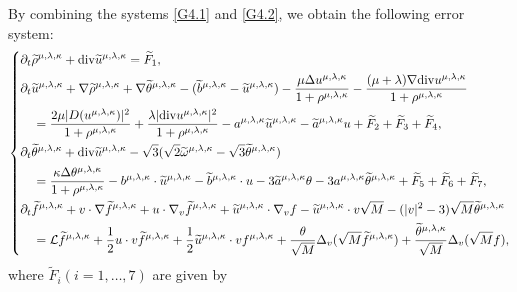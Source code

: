 \documentclass[reqno,11pt]{amsart}
\theoremstyle{plain}
\numberwithin{equation}{section}
\begin{document}
By combining the systems \eqref{G4.1} and \eqref{G4.2}, we obtain the following error system:
\begin{equation}\label{G4.3}
\left\{
\begin{aligned}
&\partial_t \widetilde{\rho}^{\mu,\lambda,\kappa}+{\rm div}\widetilde{u}^{\mu,\lambda,\kappa} =\widetilde{F}_1,\\
&\partial_{t}\widetilde{u}^{\mu,\lambda,\kappa}+\nabla \widetilde{\rho}^{\mu,\lambda,\kappa}
+\nabla\widetilde{\theta}^{\mu,\lambda,\kappa}-(\widetilde{b}^{\mu,\lambda,\kappa}-\widetilde{u}^{\mu,\lambda,\kappa})
-\frac{\mu \Delta u^{\mu,\lambda,\kappa}}{1+\rho^{\mu,\lambda,\kappa}}-\frac{(\mu+\lambda) 
\nabla {\rm div}u^{\mu,\lambda,\kappa}}{1+\rho^{\mu,\lambda,\kappa}} \\
&\quad=\frac{2\mu |D(u^{\mu,\lambda,\kappa})|^2}{1+\rho^{\mu,\lambda,\kappa}}
+\frac{ \lambda |{\rm div}u^{\mu,\lambda,\kappa}|^2}{1+\rho^{\mu,\lambda,\kappa}}
-a^{\mu,\lambda,\kappa}\widetilde{u}^{\mu,\lambda,\kappa}-\widetilde{a}^{\mu,\lambda,\kappa} u
+ \widetilde{F}_2+\widetilde{F}_3+\widetilde{F}_4,\\
&\partial_t\widetilde{\theta}^{{\mu,\lambda,\kappa}}+{\rm div}\widetilde{u}^{{\mu,\lambda,\kappa}}
-\sqrt{3}(\sqrt{2}\widetilde{\omega}^{{\mu,\lambda,\kappa}}-\sqrt{3}\widetilde{\theta}^{{\mu,\lambda,\kappa}}) \\
&\quad=\frac{\kappa\Delta\theta^{{\mu,\lambda,\kappa}}}{1+\rho^{{\mu,\lambda,\kappa}}}
-b^{\mu,\lambda,\kappa}\cdot \widetilde{u}^{\mu,\lambda,\kappa}-\widetilde{b}^{\mu,\lambda,\kappa}\cdot u
-3\widetilde{a}^{\mu,\lambda,\kappa}\theta-3a^{\mu,\lambda,\kappa}\widetilde{\theta}^{\mu,\lambda,\kappa}
+\widetilde{F}_5+\widetilde{F}_6+\widetilde{F}_7,\\
&\partial_{t}\widetilde{f}^{\mu,\lambda,\kappa}+v\cdot\nabla \widetilde{f}^{\mu,\lambda,\kappa} 
+ {u}\cdot\nabla_v\widetilde{f}^{\mu,\lambda,\kappa}+\widetilde{u}^{\mu,\lambda,\kappa}\cdot\nabla_v f
-\widetilde{u}^{\mu,\lambda,\kappa}\cdot v\sqrt{M}-(|v|^2-3)\sqrt{M}\widetilde\theta^{\mu,\lambda,\kappa} \\
&\quad= \mathcal{L}\widetilde{f}^{\mu,\lambda,\kappa}+\frac{1}{2}u\cdot v\widetilde{f}^{\mu,\lambda,\kappa}
+\frac{1}{2}\widetilde{u}^{\mu,\lambda,\kappa}\cdot vf^{\mu,\lambda,\kappa}
+\frac{\theta}{\sqrt{M}}\Delta_v(\sqrt{M}\widetilde{f}^{\mu,\lambda,\kappa})
+\frac{\widetilde\theta^{\mu,\lambda,\kappa}}{\sqrt{M}}\Delta_v(\sqrt{M} {f} )  ,
\end{aligned}\right.
\end{equation} 
where $\widetilde{F}_i(i=1,\dots,7)$  are given by
\end{document}
